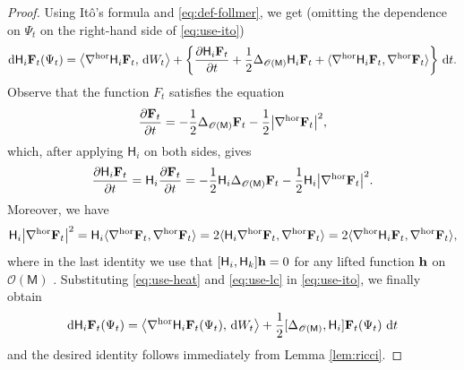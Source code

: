 \documentclass[a4paper,twoside,11pt,reqno]{amsart}
\newcommand*\diff{\mathop{}\!\mathrm{d}}
\newcommand{\li}{\bf }
\newcommand{\MM}{\mathsf{M}}
\newcommand{\ms}{\mathscr}
\newcommand{\mr}{\mathrm}
\newcommand{\HH}{\mathsf{H}}
\begin{document}
\begin{proof}
Using It\^o's formula and \eqref{eq:def-follmer}, we get (omitting the dependence on $\Psi_t$ on the right-hand side of \eqref{eq:use-ito})
\begin{equation} \label{eq:use-ito}
\diff \HH_i{\li F}_t (\Psi_t) = \big\langle \nabla^{\mr{hor}} \HH_i {\li F}_t, \,\diff W_t \big\rangle + \left\{ \frac{\partial \HH_i {\li F}_t}{\partial t} + \frac{1}{2} \Delta_{\ms{O}(\MM)} \HH_i {\li F}_t + \langle \nabla^{\mr{hor}} \HH_i {\li F}_t, \nabla^{\mr{hor}} {\li F}_t\rangle \right\} \,\diff t.
\end{equation}
Observe that the function ${F}_t$ satisfies the equation
\begin{equation}
\frac{\partial {\li F}_t}{\partial t} = -\frac{1}{2}\Delta_{\ms{O}(\MM)} {\li F}_t - \frac{1}{2}\big|\nabla^{\mathrm{hor}} {\li F}_t\big|^2,
\end{equation}
which, after applying $\HH_i$ on both sides, gives 
\begin{equation} \label{eq:use-heat}
\frac{\partial \HH_i{\li F}_t}{\partial t} = \HH_i \frac{\partial {\li F}_t}{\partial t} = -\frac{1}{2} \HH_i\Delta_{\ms{O}(\MM)} {\li F}_t - \frac{1}{2} \HH_i \big| \nabla^{\mr{hor}} {\li F}_t \big|^2.
\end{equation}
Moreover, we have
\begin{equation} \label{eq:use-lc}
 \HH_i \big| \nabla^{\mr{hor}} {\li F}_t \big|^2 =  \HH_i \langle \nabla^{\mr{hor}} {\li F}_t,  \nabla^{\mr{hor}} {\li F}_t \rangle = 2 \langle \HH_i \nabla^{\mr{hor}} {\li F}_t,  \nabla^{\mr{hor}} {\li F}_t \rangle  = 2\langle \nabla^{\mr{hor}}\HH_i {\li F}_t,  \nabla^{\mr{hor}} {\li F}_t \rangle,
\end{equation}
where in the last identity we use that $[\HH_i,\HH_k] {\li h} = 0$ for any lifted function ${\li h}$ on $\ms{O}(\MM)$ \cite[Lemma~5.5.1]{Hsu02}. Substituting \eqref{eq:use-heat} and \eqref{eq:use-lc} in \eqref{eq:use-ito}, we finally obtain
\begin{equation}
\diff \HH_i{\li F}_t (\Psi_t) = \big\langle \nabla^{\mr{hor}} \HH_i {\li F}_t(\Psi_t), \,\diff W_t \big\rangle + \frac{1}{2} [\Delta_{\ms{O}(\MM)}, \HH_i]{\li F}_t(\Psi_t) \,\diff t
\end{equation}
and the desired identity follows immediately from Lemma \ref{lem:ricci}.
\end{proof}

\end{document}
